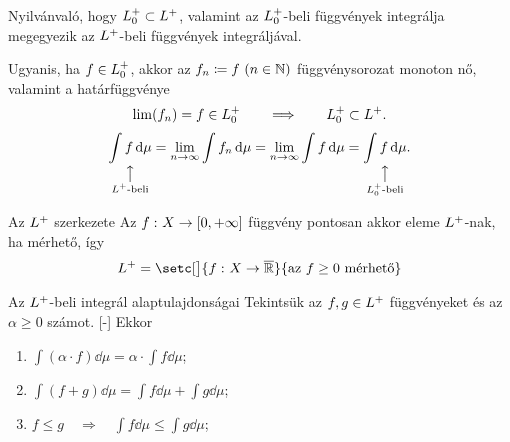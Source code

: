 \documentclass[
]{elteikthesis}[2024/04/26]
\begin{document}
	\begin{notes}
		\item 
		Nyilvánvaló, hogy \( \StepFuncPos \subset \StepFuncPlus \),
		valamint az \( \StepFuncPos \)-beli függvények integrálja megegyezik az 
		\( L^+ \)-beli függvények integráljával.
		
		Ugyanis, ha \( f \in \StepFuncPos \), akkor az \( f_n \coloneq f \ (n \in \mathbb{N}) \)
		függvénysorozat monoton nő, valamint a határfüggvénye
		\[
			\lim(f_n) = f \in \StepFuncPos
			\qquad \Longrightarrow \qquad
			\StepFuncPos \subset \StepFuncPlus.
		\]
		\[
			\underset{
				\substack{
					\mathclap{\big\uparrow} \\
					\mathclap{\StepFuncPlus \text{-beli}}
				}
			}{\int f \dd{\mu}} = 
			\lim_{n \to \infty} \int f_n \dd{\mu} =
			\lim_{n \to \infty} \int f \dd{\mu} =
			\underset{
				\substack{
					\mathclap{\big\uparrow} \\
					\mathclap{\StepFuncPos \text{-beli}}
				}
			}{\int f \dd{\mu}}.
		\]
	\end{notes}
	
	\begin{theorem}{Az \( L^+ \) szerkezete}{}
		Az \( f \,\colon X \to [0, +\infty] \) függvény pontosan akkor eleme \( L^+ \)-nak, 
		ha mérhető, így
		\[
			\StepFuncPlus =
			\setc[\big]{ \func{f}{X}{\overline{ \R }} }{ \text{az } f \geq 0 \text{ mérhető}}
		\]
	\end{theorem}
	
	\begin{theorem}{Az \( L^+ \)-beli integrál alaptulajdonságai}{}
		Tekintsük az \( f, g \in L^+ \) függvényeket és az \( \alpha \geq 0 \) számot. 
		[-\baselineskip]
		Ekkor
		\begin{enumerate}
			\item \( \displaystyle \int (\alpha \cdot f) \dd{\mu} = \alpha \cdot \int f \dd{\mu} \);
			\item \( \displaystyle \int (f + g) \dd{\mu} = \int f \dd{\mu} + \int g \dd{\mu} \);
			\item \( \displaystyle f \leq g \quad \Longrightarrow \quad \int f \dd{\mu} \leq \int g \dd{\mu} \);
		\end{enumerate}
	\end{theorem}
	
\end{document}
